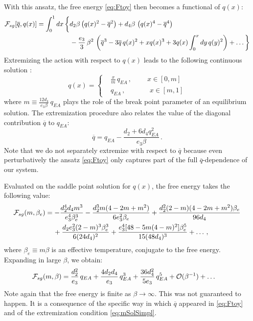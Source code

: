 \documentclass[aps,prx,preprint,onecolumn,citeautoscript,superscriptaddress,nofootinbib,
eqsecnum]{revtex4}
\begin{document}
{With this ansatz, the free energy \eqref{eq:Ftoy} then becomes a functional of $q(x)$:
\begin{equation}
\begin{split}
{\cal F}_{sg}[\overline{q},q(x)] &=  \int_0^1 dx \, \bigg\{ d_2\beta  \left(   q(x)^2-\overline{q}^2 \right) + d_4\beta \, \left( q(x)^4- \overline{q}^4 \right) \\
 &\qquad \qquad\quad - \frac{e_3}{3}\, \beta^2 \,  \left( \overline{q}^3 - 3 \overline{q} \, q(x)^2  + x q(x)^3 + 3 q(x) \int_0^x dy \, q(y)^2 \right) + \ldots\bigg\}
\end{split}
\end{equation}
Extremizing the action with respect to $q(x)$ leads to the following continuous solution \cite{fischer1993spin}:
\begin{equation}
q(x) = \left\{ \begin{aligned} &\frac{x}{m} \, q_{EA}\,, \qquad\; x\in \left[ 0, m\right]\\
  &q_{EA}\,, \qquad\quad\;\; x \in \left[ m, 1\right]
  \end{aligned} \right.
\end{equation}
where $m  \equiv \frac{12 d_4}{e_3\beta} \,q_{EA}$ plays the role of the break point parameter of an equilibrium solution. The extremization procedure also relates the value of the diagonal contribution $\overline{q}$ to $q_{EA}$: 
\begin{equation}
\label{eq:mSolSimpl}
 \overline{q} = q_{EA} - \frac{d_2 + 6 d_4 q_{EA}^2}{e_3 \beta} \,.
\end{equation}
Note that we do not separately extremize with respect to $\overline{q}$ because even perturbatively the ansatz \eqref{eq:Ftoy} only captures part of the full $\overline{q}$-dependence of our system.

Evaluated on the saddle point solution for $q(x)$, the free energy takes the following value:
\begin{equation}
\begin{split}
{\cal F}_{sg}(m,\beta_e) &= - \frac{d_2^4 d_4 m^3}{e_3^4 \beta_e^3} - \frac{d_2^3 m(4-2m+m^2)}{6e_3^2 \beta_e} + \frac{d_2^2(2-m)(4-2m+m^2)\beta_e}{96 d_4} \\
&\quad\, + \frac{d_2 e_3^2 (2-m)^3 \beta_e^3}{6 (24 d_4)^2} + \frac{e_3^4[48-5m(4-m)^2]\beta_e^5}{15 (48d_4)^3} + \ldots\,,
\end{split}
\end{equation}
where $\beta_e \equiv m\beta$ is an effective temperature, conjugate to the free energy. Expanding in large $\beta$, we obtain:
\begin{equation}
\begin{split}
{\cal F}_{sg}(m,\beta)  &= \frac{d_2^2}{e_3} \, q_{EA} + \frac{4d_2 d_4}{e_3} \, q_{EA}^3 + \frac{36d_4^2}{5e_3} \, q_{EA}^5 + {\cal O}(\beta^{-1}) + \ldots 
  \end{split}
\end{equation}
Note again that the free energy is finite as $\beta \rightarrow \infty$. This was not guaranteed to happen. It is a consequence of the specific way in which $\overline{q}$ appeared in \eqref{eq:Ftoy} and of the extremization condition \eqref{eq:mSolSimpl}.

}
\end{document}
